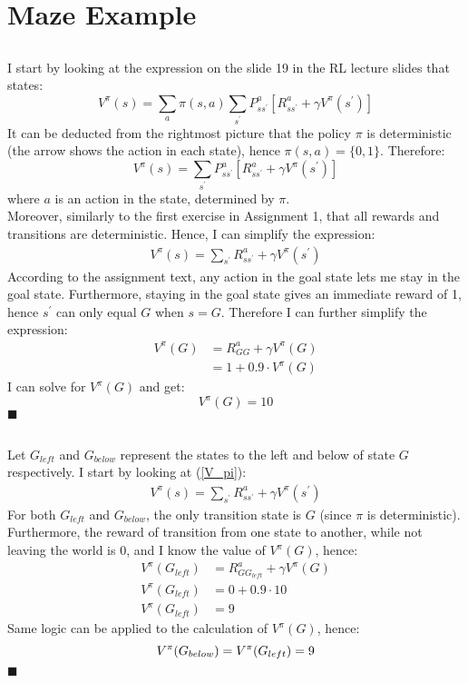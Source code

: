 \documentclass[a4paper]{article}
\newcommand*{\QEDA}{\hfill\ensuremath{\blacksquare}}%
\begin{document}
\newpage
\section{Maze Example}
\label{sec:2}
\subsection{}
\label{subsec:21}
I start by looking at the expression on the slide 19 in the RL lecture slides that states:
\[
V^{\pi}(s)
=\sum_{a} \pi(s, a) \sum_{s^{\prime}} P_{s s^{\prime}}^{a}
\left[R_{s s^{\prime}}^{a}+\gamma V^{\pi}\left(s^{\prime}\right)\right]
\]
It can be deducted from the rightmost picture that the policy $\pi$ is
deterministic (the arrow shows the action in each state), hence
$\pi(s,a) = \{0,1\}$. Therefore:
\[
V^{\pi}(s) =\sum_{s^{\prime}} P_{s s^{\prime}}^{a}
\left[R_{s s^{\prime}}^{a}+\gamma V^{\pi}\left(s^{\prime}\right)\right]
\]
where $a$ is an action in the state, determined by $\pi$.\\
Moreover, similarly to the first exercise in Assignment 1, that all rewards and
transitions are deterministic. Hence, I can simplify the expression:
\begin{align}
  \label{V_pi}
  V^{\pi}(s) = \sum_{s^{\prime}} R_{s s^{\prime}}^{a}+\gamma V^{\pi}\left(s^{\prime}\right)
\end{align}
According to the assignment text, any action in the goal state lets me stay in
the goal state. Furthermore, staying in the goal state gives an immediate reward of 1,
hence $s^{\prime}$ can only equal $G$ when $s = G$. Therefore I can further simplify
the expression:
\begin{align*}
  V^{\pi}(G) &= R_{G G}^{a}+\gamma V^{\pi}\left(G\right) \\
  &= 1 + 0.9 \cdot V^{\pi}(G)
\end{align*}
I can solve for $V^{\pi}(G)$ and get:
\[
V^{\pi}(G) = 10
\]
\QEDA

\subsection{}
\label{subsec:21}
Let $G_{left}$ and $G_{below}$ represent the states to the left and below of
state $G$ respectively. I start by looking at (\ref{V_pi}):
\begin{align*}
  V^{\pi}(s) = \sum_{s^{\prime}} R_{s s^{\prime}}^{a}+\gamma V^{\pi}\left(s^{\prime}\right)
\end{align*}
For both $G_{left}$ and $G_{below}$, the only transition state is $G$ (since
$\pi$ is deterministic). Furthermore, the reward of transition from one state to
another, while not leaving the world is 0, and I know the value of $V^{\pi}(G)$, hence:
\begin{align*}
  V^{\pi}(G_{left}) &= R_{G G_{left}}^{a}+\gamma V^{\pi}(G) \\
  V^{\pi}(G_{left}) &= 0+0.9 \cdot 10 \\
  V^{\pi}(G_{left}) &= 9 
\end{align*}
Same logic can be applied to the calculation of $V^{\pi}(G)$, hence:
\[
  V^{\pi}(G_{below}) = V^{\pi}(G_{left}) = 9 \\
\]
\QEDA
\newpage
\end{document}
